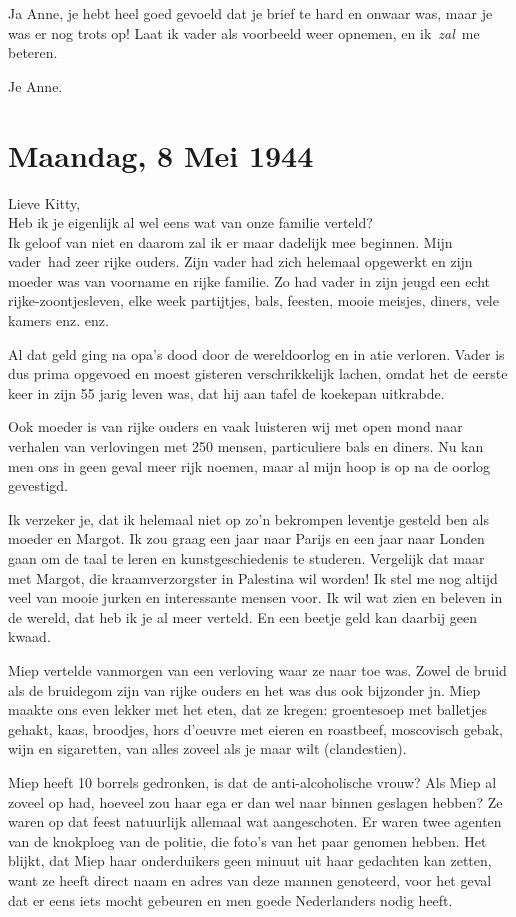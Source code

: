 \documentclass{book}
\begin{document}
Ja Anne, je hebt heel goed gevoeld dat je brief te hard en onwaar was,
maar je was er nog trots op! Laat ik vader als voorbeeld weer opnemen,
en ik~\emph{zal}~me beteren.

Je Anne.

\chapter{Maandag, 8 Mei 1944}

Lieve Kitty,\\Heb ik je eigenlijk al wel eens wat van onze familie
verteld?\\Ik geloof van niet en daarom zal ik er maar dadelijk mee
beginnen. Mijn vader~had zeer rijke ouders. Zijn vader had zich helemaal
opgewerkt en zijn moeder was van voorname en rijke familie. Zo had vader
in zijn jeugd een echt rijke-zoontjesleven, elke week partijtjes, bals,
feesten, mooie meisjes, diners, vele kamers enz. enz.

Al dat geld ging na opa's dood door de wereldoorlog en in atie verloren.
Vader is dus prima opgevoed en moest gisteren verschrikkelijk lachen,
omdat het de eerste keer in zijn 55 jarig leven was, dat hij aan tafel
de koekepan uitkrabde.

Ook moeder is van rijke ouders en vaak luisteren wij met open mond naar
verhalen van verlovingen met 250 mensen, particuliere bals en diners. Nu
kan men ons in geen geval meer rijk noemen, maar al mijn hoop is op na
de oorlog gevestigd.

Ik verzeker je, dat ik helemaal niet op zo'n bekrompen leventje gesteld
ben als moeder en Margot. Ik zou graag een jaar naar Parijs en een jaar
naar Londen gaan om de taal te leren en kunstgeschiedenis te studeren.
Vergelijk dat maar met Margot, die kraamverzorgster in Palestina wil
worden! Ik stel me nog altijd veel van mooie jurken en interessante
mensen voor. Ik wil wat zien en beleven in de wereld, dat heb ik je al
meer verteld. En een beetje geld kan daarbij geen kwaad.

Miep vertelde vanmorgen van een verloving waar ze naar toe was. Zowel de
bruid als de bruidegom zijn van rijke ouders en het was dus ook
bijzonder jn. Miep maakte ons even lekker met het eten, dat ze kregen:
groentesoep met balletjes gehakt, kaas, broodjes, hors d'oeuvre met
eieren en roastbeef, moscovisch gebak, wijn en sigaretten, van alles
zoveel als je maar wilt (clandestien).

Miep heeft 10 borrels gedronken, is dat de anti-alcoholische vrouw? Als
Miep al zoveel op had, hoeveel zou haar ega er dan wel naar binnen
geslagen hebben? Ze waren op dat feest natuurlijk allemaal wat
aangeschoten. Er waren twee agenten van de knokploeg van de politie, die
foto's van het paar genomen hebben. Het blijkt, dat Miep haar
onderduikers geen minuut uit haar gedachten kan zetten, want ze heeft
direct naam en adres van deze mannen genoteerd, voor het geval dat er
eens iets mocht gebeuren en men goede Nederlanders nodig heeft.
\end{document}
